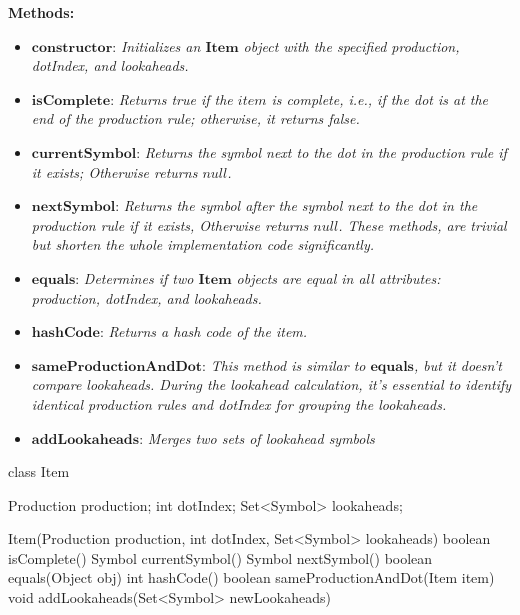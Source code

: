 \textbf{Methods:}
\begin{itemize}
    \item \(\boldsymbol{constructor}\): \textit{Initializes an \(\boldsymbol{Item}\) object with the specified production, dotIndex, and lookaheads.}
    \item \(\boldsymbol{isComplete}\): \textit{Returns true if the \(item\) is complete, i.e., if the dot is at the end of the production rule; otherwise, it returns false.}
    \item \(\boldsymbol{currentSymbol}\): \textit{Returns the symbol next to the dot in the production rule if it exists; Otherwise returns \(null\).}
    \item \(\boldsymbol{nextSymbol}\): \textit{Returns the symbol after the symbol next to the dot in the production rule if it exists, Otherwise returns \(null\). These methods, are trivial but shorten the whole implementation code significantly.}
    \item \(\boldsymbol{equals}\): \textit{Determines if two \(\boldsymbol{Item}\) objects are equal in all attributes: production, dotIndex, and lookaheads.}
    \item \(\boldsymbol{hashCode}\): \textit{Returns a hash code of the item.}
    \item \(\boldsymbol{sameProductionAndDot}\): \textit{This method is similar to \(\boldsymbol{equals}\), but it doesn't compare lookaheads. During the lookahead calculation, it's essential to identify identical production rules and dotIndex for grouping the lookaheads.}
    \item \(\boldsymbol{addLookaheads}\): \textit{Merges two sets of lookahead symbols}
\end{itemize}

\begin{codeblock}
    class Item {
        Production production;
        int dotIndex;
        Set<Symbol> lookaheads;

        Item(Production production, int dotIndex, Set<Symbol> lookaheads) {}
        boolean isComplete() {}
        Symbol currentSymbol() {}
        Symbol nextSymbol(){}
        boolean equals(Object obj) {}
        int hashCode() {}
        boolean sameProductionAndDot(Item item) {}
        void addLookaheads(Set<Symbol> newLookaheads) {}
    }
\end{codeblock}

\vspace{10pt}

